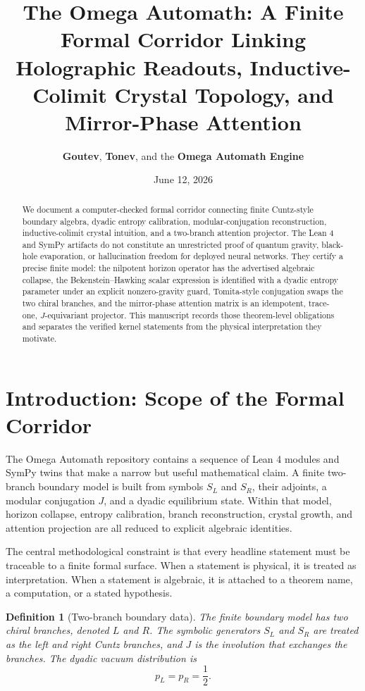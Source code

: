 \documentclass[11pt,a4paper]{article}
\title{\textbf{The Omega Automath: A Finite Formal Corridor Linking Holographic Readouts, Inductive-Colimit Crystal Topology, and Mirror-Phase Attention}}
\author{\textbf{Goutev}, \textbf{Tonev}, and the \textbf{Omega Automath Engine}}
\date{June 12, 2026}
\newtheorem{definition}{Definition}
\begin{document}
\maketitle

\begin{abstract}
We document a computer-checked formal corridor connecting finite Cuntz-style boundary algebra, dyadic entropy calibration, modular-conjugation reconstruction, inductive-colimit crystal intuition, and a two-branch attention projector. The Lean 4 and SymPy artifacts do not constitute an unrestricted proof of quantum gravity, black-hole evaporation, or hallucination freedom for deployed neural networks. They certify a precise finite model: the nilpotent horizon operator has the advertised algebraic collapse, the Bekenstein--Hawking scalar expression is identified with a dyadic entropy parameter under an explicit nonzero-gravity guard, Tomita-style conjugation swaps the two chiral branches, and the mirror-phase attention matrix is an idempotent, trace-one, $J$-equivariant projector. This manuscript records those theorem-level obligations and separates the verified kernel statements from the physical interpretation they motivate.
\end{abstract}

\section{Introduction: Scope of the Formal Corridor}

The Omega Automath repository contains a sequence of Lean 4 modules and SymPy twins that make a narrow but useful mathematical claim. A finite two-branch boundary model is built from symbols $S_L$ and $S_R$, their adjoints, a modular conjugation $J$, and a dyadic equilibrium state. Within that model, horizon collapse, entropy calibration, branch reconstruction, crystal growth, and attention projection are all reduced to explicit algebraic identities.

The central methodological constraint is that every headline statement must be traceable to a finite formal surface. When a statement is physical, it is treated as interpretation. When a statement is algebraic, it is attached to a theorem name, a computation, or a stated hypothesis.

\begin{definition}[Two-branch boundary data]
The finite boundary model has two chiral branches, denoted $L$ and $R$. The symbolic generators $S_L$ and $S_R$ are treated as the left and right Cuntz branches, and $J$ is the involution that exchanges the branches. The dyadic vacuum distribution is
\[
  p_L = p_R = \frac12.
\]
\end{definition}
\end{document}
